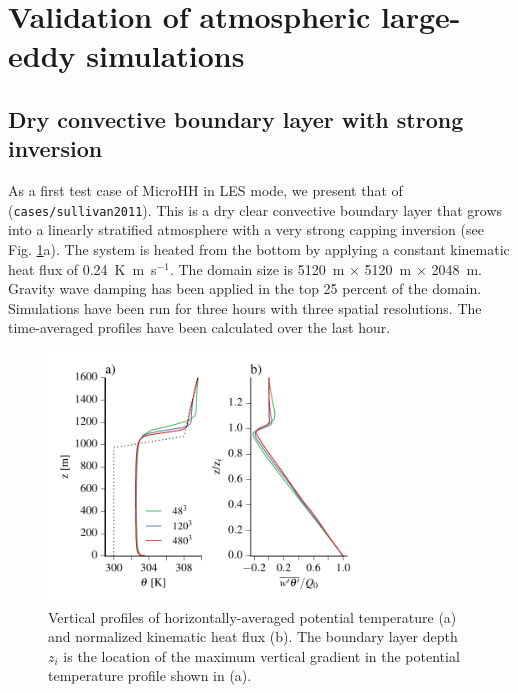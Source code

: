 \documentclass[gmd,manuscript]{copernicus}
\begin{document}
\section{Validation of atmospheric large-eddy simulations}\label{sec:validation_atmos}
\subsection{Dry convective boundary layer with strong inversion}
As a first test case of MicroHH in LES mode, we present that of \citet{Sullivan2011} (\texttt{cases/sullivan2011}). This is a dry clear convective boundary layer that grows into a linearly stratified atmosphere with a very strong capping inversion (see Fig. \ref{fig:sullivan2011}a). The system is heated from the bottom by applying a constant kinematic heat flux of 0.24~K~m~s$^{-1}$. The domain size is 5120~m $\times$ 5120~m $\times$ 2048~m. Gravity wave damping has been applied in the top 25 percent of the domain. Simulations have been run for three hours with three spatial resolutions. The time-averaged profiles have been calculated over the last hour.

\begin{figure}[t]
	\vspace*{2mm}
	\begin{center}
		\includegraphics[width=8.3cm]{figs/sullivan2011.pdf}
	\end{center}
	\caption{Vertical profiles of horizontally-averaged potential temperature (a) and normalized kinematic heat flux (b). The boundary layer depth $z_i$ is the location of the maximum vertical gradient in the potential temperature profile shown in (a). }
	\label{fig:sullivan2011}
\end{figure}
\end{document}
